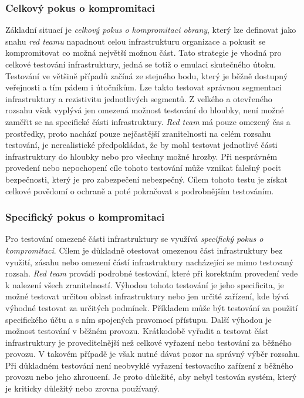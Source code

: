 \subsubsection{Celkový pokus o kompromitaci}
Základní situací je \textit{celkový pokus o kompromitaci obrany}, který lze definovat jako snahu \textit{red teamu} napadnout celou infrastrukturu organizace a pokusit se kompromitovat co možná největší možnou část.
Tato strategie je vhodná pro celkové testování infrastruktury, jedná se totiž o emulaci skutečného útoku.
Testování ve většině případů začíná ze stejného bodu, který je běžně dostupný veřejnosti a tím pádem i útočníkům.
Lze takto testovat správnou segmentaci infrastruktury a rezistivitu jednotlivých segmentů.
Z velkého a otevřeného rozsahu však vyplývá jen omezená možnost testování do hloubky, není možné zaměřit se na specifické části infrastruktury.
\textit{Red team} má pouze omezený čas a prostředky, proto nachází pouze nejčastější zranitelnosti na celém rozsahu testování, je nerealistické předpokládat, že by mohl testovat jednotlivé části infrastruktury do hloubky nebo pro všechny možné hrozby.
Při nesprávném provedení nebo nepochopení cíle tohoto testování může vznikat falešný pocit bezpečnosti, který je pro zabezpečení nebezpečný.
Cílem tohoto testu je získat celkové povědomí o ochraně a poté pokračovat s podrobnějším testováním.

\subsubsection{Specifický pokus o kompromitaci}
Pro testování omezené části infrastruktury se využívá \textit{specifický pokus o kompromitaci}.
Cílem je důkladně otestovat omezenou část infrastruktury bez využití, zásahu nebo omezení částí infrastruktury nacházející se mimo testovaný rozsah.
\textit{Red team} provádí podrobné testování, které při korektním provedení vede k nalezení všech zranitelností.
Výhodou tohoto testování je jeho specificita, je možné testovat určitou oblast infrastruktury nebo jen určité zařízení, kde bývá výhodné testovat za určitých podmínek.
Příkladem může být testování za použití specifického účtu a s ním spojených pravomocí přístupu.
Další výhodou je možnost testování v běžném provozu.
Krátkodobě vyřadit a testovat část infrastruktury je proveditelnější než celkové vyřazení nebo testování za běžného provozu.
V takovém případě je však nutné dávat pozor na správný výběr rozsahu.
Při důkladném testování není neobvyklé vyřazení testovacího zařízení z běžného provozu nebo jeho zhroucení.
Je proto důležité, aby nebyl testován systém, který je kriticky důležitý nebo zrovna používaný.

